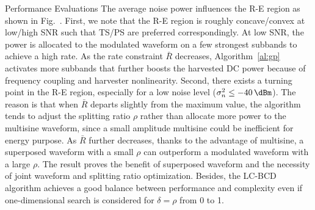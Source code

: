 \documentclass[journal]{IEEEtran}
\begin{document}
\begin{section}{Performance Evaluations}
		The average noise power influences the R-E region as shown in Fig.~. First, we note that the R-E region is roughly concave/convex at low/high SNR such that TS/PS are preferred correspondingly. At low SNR, the power is allocated to the modulated waveform on a few strongest subbands to achieve a high rate. As the rate constraint $\bar{R}$ decreases, Algorithm~\ref{al:gp} activates more subbands that further boosts the harvested DC power because of frequency coupling and harvester nonlinearity. Second, there exists a turning point in the R-E region, especially for a low noise level ($\sigma_n^2 \le \SI{-40}{\dBm}$). The reason is that when $\bar{R}$ departs slightly from the maximum value, the algorithm tends to adjust the splitting ratio $\rho$ rather than allocate more power to the multisine waveform, since a small amplitude multisine could be inefficient for energy purpose. As $\bar{R}$ further decreases, thanks to the advantage of multisine, a superposed waveform with a small $\rho$ can outperform a modulated waveform with a large $\rho$. The result proves the benefit of superposed waveform and the necessity of joint waveform and splitting ratio optimization. Besides, the LC-BCD algorithm achieves a good balance between performance and complexity even if one-dimensional search is considered for $\delta=\rho$ from \num{0} to \num{1}.


\end{section}
\end{document}
